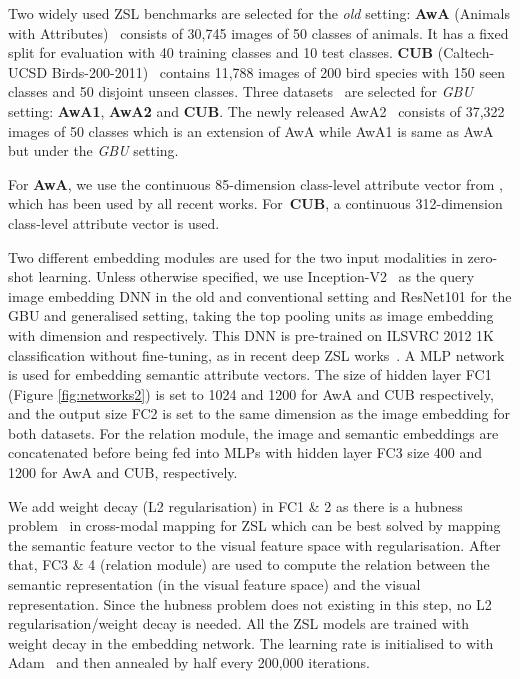 \documentclass[10pt,twocolumn,letterpaper]{article}
\begin{document}
Two widely used ZSL benchmarks are selected for the \emph{old} setting:
\textbf{AwA} (Animals with Attributes)~\cite{lampert2014attribute} consists of 30,745 images of 50 classes of animals. It has a fixed split for evaluation with 40 training classes and 10 test classes. \textbf{CUB} (Caltech-UCSD Birds-200-2011)~\cite{wah2011multiclass} contains 11,788 images of 200 bird species with 150 seen classes and 50 disjoint unseen classes. 
Three datasets~\cite{xian2017zero} are selected for \emph{GBU} setting: \textbf{AwA1}, \textbf{AwA2} and \textbf{CUB}. The newly released AwA2~\cite{xian2017zero} consists of 37,322 images of 50 classes which is an extension of AwA while AwA1 is same as AwA but under the \emph{GBU} setting.



For \textbf{AwA}, we use the continuous 85-dimension class-level attribute vector from \cite{lampert2014attribute}, which has been used by all recent works. For~\textbf{CUB}, a continuous 312-dimension class-level attribute vector is used.

Two different embedding modules are used for the two input modalities in zero-shot learning. 
Unless otherwise specified, we use Inception-V2~\cite{szegedy2015going, ioffe2015batch} as the query image embedding DNN   in the old and conventional setting and ResNet101 \cite{he2016cvpr} for the GBU and generalised setting, taking the top pooling units as image embedding with dimension  and  respectively. This DNN is pre-trained on ILSVRC 2012 1K classification without fine-tuning,  as in recent deep ZSL works~\cite{lei2015predicting, reed2016learning, zhang2017learning}. A MLP network is used for embedding semantic attribute vectors. The size of  hidden layer FC1 (Figure \ref{fig:networks2}) is set to 1024 and 1200 for AwA and CUB respectively, and the output size FC2 is set to the same dimension as the image embedding for both datasets. For the relation module, the image and semantic embeddings are concatenated before being fed into MLPs with hidden layer FC3 size 400 and 1200 for AwA and CUB, respectively. 

We add weight decay (L2 regularisation) in FC1 \& 2 as there is a hubness problem~\cite{zhang2017learning} in cross-modal mapping
for ZSL which can be best solved by mapping the semantic feature vector to the visual feature space with regularisation. After that, FC3 \& 4 (relation module) are used to compute the relation between the semantic representation (in the visual feature space) and the visual representation. Since the hubness problem does not existing in this step, no L2 regularisation/weight decay is needed.
All the ZSL models are trained with weight decay  in the embedding network. The learning rate is initialised to  with Adam~\cite{kingma2014adam} and then annealed by half every 200,000 iterations.
\end{document}
